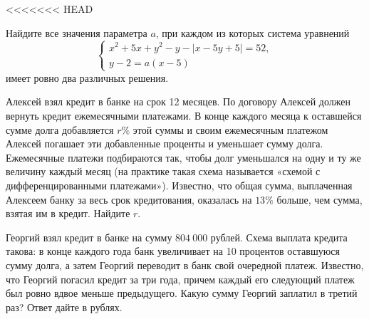 <<<<<<< HEAD
\begin{class}[number=8]
	\begin{listofex}
		\item Найдите все значения параметра \( a \), при каждом из которых система уравнений
		\[ \left\{
		\begin{array}{l}
			x^2+5x+y^2-y-|x-5y+5|=52,\\
			y-2=a(x-5)
		\end{array}
		\right. \]
		имеет ровно два различных решения.
		\item Алексей взял кредит в банке на срок 12 месяцев.
		По договору Алексей должен вернуть кредит ежемесячными платежами.
		В конце каждого месяца к оставшейся сумме долга добавляется \( r\% \) этой суммы и своим ежемесячным платежом Алексей погашает эти добавленные проценты и уменьшает сумму долга.
		Ежемесячные платежи подбираются так, чтобы долг уменьшался на одну и ту же величину каждый месяц (на практике такая схема называется «схемой с дифференцированными платежами»).
		Известно, что общая сумма, выплаченная Алексеем банку за весь срок кредитования, оказалась на \( 13\% \) больше, чем сумма, взятая им в кредит. Найдите \( r \).
		\item Георгий взял кредит в банке на сумму \( 804\:000 \) рублей.
		Схема выплата кредита такова: в конце каждого года банк увеличивает на 10 процентов оставшуюся сумму долга,
		а затем Георгий переводит в банк свой очередной платеж.
		Известно, что Георгий погасил кредит за три года, причем каждый его следующий платеж был ровно вдвое меньше предыдущего.
		Какую сумму Георгий заплатил в третий раз?
		Ответ дайте в рублях.
	\end{listofex}
\end{class}

